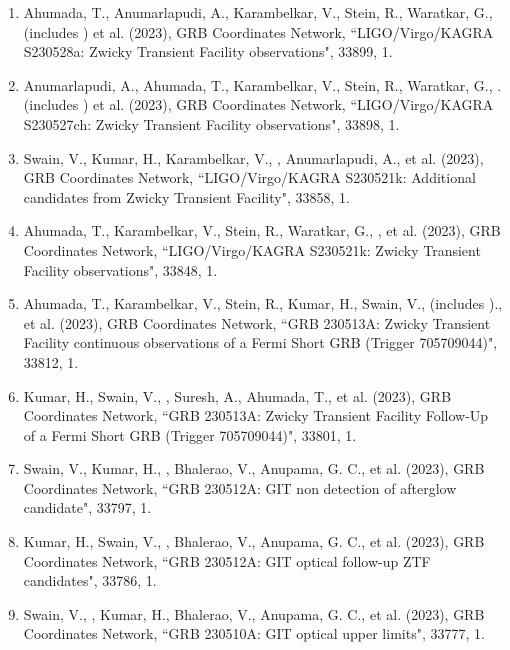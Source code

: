 \begin{enumerate}[leftmargin=*]
\item Ahumada, T., Anumarlapudi, A., Karambelkar, V., Stein, R., Waratkar, G., (includes \me) et al. (2023), GRB Coordinates Network, {``LIGO/Virgo/KAGRA S230528a: Zwicky Transient Facility observations"}, 33899, 1.

\item Anumarlapudi, A., Ahumada, T., Karambelkar, V., Stein, R., Waratkar, G., .(includes \me) et al. (2023), GRB Coordinates Network, {``LIGO/Virgo/KAGRA S230527ch: Zwicky Transient Facility observations"}, 33898, 1.

\item Swain, V., Kumar, H., Karambelkar, V., \me, Anumarlapudi, A., et al. (2023), GRB Coordinates Network, {``LIGO/Virgo/KAGRA S230521k: Additional candidates from Zwicky Transient Facility"}, 33858, 1.

\item Ahumada, T., Karambelkar, V., Stein, R., Waratkar, G., \me, et al. (2023), GRB Coordinates Network, {``LIGO/Virgo/KAGRA S230521k: Zwicky Transient Facility observations"}, 33848, 1.

\item Ahumada, T., Karambelkar, V., Stein, R., Kumar, H., Swain, V., (includes \me)., et al. (2023), GRB Coordinates Network, {``GRB 230513A: Zwicky Transient Facility continuous observations of a Fermi Short GRB (Trigger 705709044)"}, 33812, 1.

\item Kumar, H., Swain, V., \me, Suresh, A., Ahumada, T., et al. (2023), GRB Coordinates Network, {``GRB 230513A: Zwicky Transient Facility Follow-Up of a Fermi Short GRB (Trigger 705709044)"}, 33801, 1.

\item Swain, V., Kumar, H., \me, Bhalerao, V., Anupama, G. C., et al. (2023), GRB Coordinates Network, {``GRB 230512A: GIT non detection of afterglow candidate"}, 33797, 1.

\item Kumar, H., Swain, V., \me, Bhalerao, V., Anupama, G. C., et al. (2023), GRB Coordinates Network, {``GRB 230512A: GIT optical follow-up ZTF candidates"}, 33786, 1.

\item Swain, V., \me, Kumar, H., Bhalerao, V., Anupama, G. C., et al. (2023), GRB Coordinates Network, {``GRB 230510A: GIT optical upper limits"}, 33777, 1.

\end{enumerate}